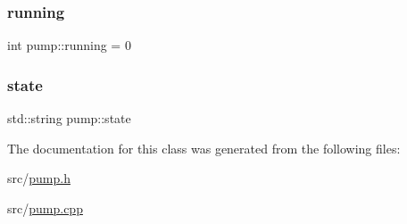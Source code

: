\mbox{\label{classpump_ad797d26b29fe1ebf7ad6f6590fb2c674}} 
\subsubsection{\texorpdfstring{running}{running}}
{\footnotesize\ttfamily int pump\+::running = 0\hspace{0.3cm}{\ttfamily [private]}}

\mbox{\label{classpump_ad96353945f20f718e8eba930fa8405ba}} 
\subsubsection{\texorpdfstring{state}{state}}
{\footnotesize\ttfamily std\+::string pump\+::state\hspace{0.3cm}{\ttfamily [private]}}



The documentation for this class was generated from the following files\+:\begin{DoxyCompactItemize}
\item 
src/\hyperlink{pump_8h}{pump.\+h}\item 
src/\hyperlink{pump_8cpp}{pump.\+cpp}\end{DoxyCompactItemize}
